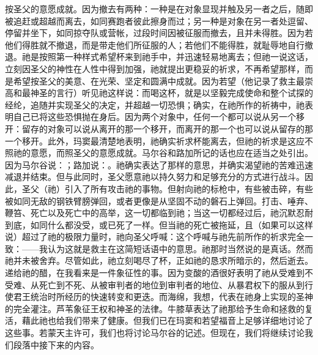 按圣父的意愿成就。因为撤去有两种：一种是在对象显现并触及另一者之后，随即被追赶或超越而离去，如同赛跑者彼此擦身而过；另一种是对象在另一者处逗留、停留并坐下，如同掠夺队或营帐，过段时间因被征服而撤去，且并未得胜。因为若他们得胜就不撤退，而是带走他们所征服的人；若他们不能得胜，就耻辱地自行撤退。祂是按照第一种样式希望杯来到祂手中，并迅速轻易地离去；但祂一说这话，立刻因圣父的神性在人性中得到加强，祂就提出更稳妥的祈求，不再希望那样，而是希望按圣父的美意、在光荣、坚定和圆满中成就。因为若望（他记录了救主最崇高和最神圣的言行）听见祂这样说：而喝这杯，就是以坚毅完成使命和整个试探的经纶，追随并实现圣父的决定，并超越一切恐惧；确实，在祂所作的祈祷中，祂表明自己已将这些恐惧抛在身后。因为两个对象中，任何一个都可以说从另一个移开：留存的对象可以说从离开的那一个移开，而离开的那一个也可以说从留存的那一个移开。此外，玛窦最清楚地表明，祂确实祈求杯能离去，但祂的祈求是这应不照祂的意愿，而照圣父的意愿成就。马尔谷和路加所记的话也应在适当之处引出。因为马尔谷说：；路加说：。祂确实表达了那样的意思，并确实渴望祂的苦难迅速减退并结束。但与此同时，圣父愿意祂以持久努力和足够充分的方式进行战斗。因此，圣父（祂）引入了所有攻击祂的事物。但射向祂的标枪中，有些被击碎，有些被如同无敌的钢铁臂膀弹回，或者更像是从坚固不动的磐石上弹回。打击、唾弃、鞭笞、死亡以及死亡中的高举，这一切都临到祂；当这一切都经过后，祂沉默忍耐到底，如同什么都没受，或已死了一样。但当祂的死亡被拖延，且（如果可以这样说）超过了祂的极限力量时，祂向圣父呼喊：这个呼喊与祂先前所作的祈求完全一致：——我认为这就是救主在这简短话语中的意思。祂那时当然说的是真话。然而祂并未被舍弃。尽管如此，祂立刻喝尽了杯，正如祂的恳求所暗示的，然后逝去。递给祂的醋，在我看来是一件象征性的事。因为变酸的酒很好表明了祂从受难到不受难、从死亡到不死、从被审判者的地位到审判者的地位、从暴君权下的服从到行使君王统治时所经历的快速转变和更迭。而海绵，我想，代表在祂身上实现的圣神的完全灌注。芦苇象征王权和神圣的法律。牛膝草表达了祂那给予生命和拯救的复活，藉此祂也给我们带来了健康。但我们已在玛窦和若望福音上足够详细地讨论了这些事。若蒙天主许可，我们也将讨论马尔谷的记述。但现在，我们将继续讨论我们段落中接下来的内容。\par


